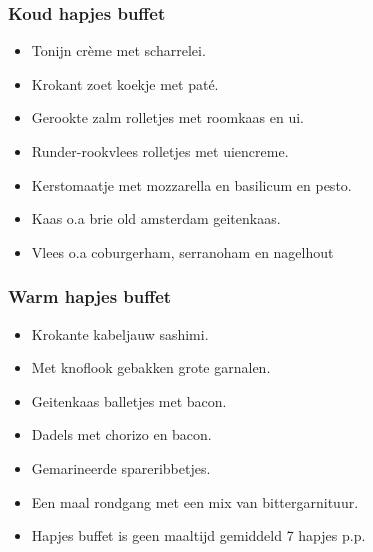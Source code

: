 \subsubsection{Koud hapjes buffet}
\begin{itemize}
	\item Tonijn crème met scharrelei.
	\item Krokant zoet koekje met paté.
	\item Gerookte zalm rolletjes met roomkaas en ui.
	\item Runder-rookvlees rolletjes met uiencreme.
	\item Kerstomaatje met mozzarella en basilicum en pesto.
	\item Kaas o.a brie old amsterdam geitenkaas.
	\item Vlees o.a coburgerham, serranoham en nagelhout
\end{itemize}
\subsubsection{Warm hapjes buffet}

\begin{itemize}
	\item Krokante kabeljauw sashimi.
	\item Met knoflook gebakken grote garnalen.
	\item Geitenkaas balletjes met bacon.
	\item Dadels met chorizo en bacon.
	\item Gemarineerde spareribbetjes.
	\item Een maal rondgang met een mix van bittergarnituur.
	\item Hapjes buffet is geen maaltijd gemiddeld 7 hapjes p.p.
\end{itemize}
